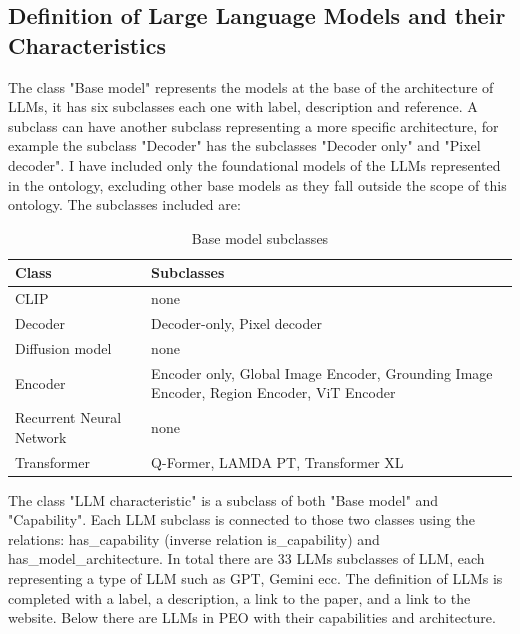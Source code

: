 \subsection{Definition of Large Language Models and their Characteristics}
\label{subsection:4_3_3_llms}
The class "Base model" represents the models at the base of the architecture of LLMs, it has six subclasses each one with label, description and reference.
A subclass can have another subclass representing a more specific architecture, for example the subclass "Decoder" has the subclasses "Decoder only" and "Pixel decoder". 
I have included only the foundational models of the LLMs represented in the ontology, excluding other base models as they fall outside the scope of this ontology.
The subclasses included are: 
\begin{table}[H]
    \footnotesize 
    \centering
    \begin{tabular}{|>{\raggedright\arraybackslash}p{6cm}|>{\raggedright\arraybackslash}p{6cm}|}
        \hline
        Class & Subclasses \\ \hline
         CLIP & none \\ \hline
         
         Decoder & Decoder-only, Pixel decoder \\ \hline
         
         Diffusion model & none \\ \hline
         
         Encoder & Encoder only, Global Image Encoder, Grounding Image Encoder, Region Encoder, ViT Encoder \\ \hline
         
         Recurrent Neural Network & none \\ \hline

        Transformer & Q-Former, LAMDA PT, Transformer XL \\ \hline
    \end{tabular}
    \caption{Base model subclasses}
\end{table}
The class "LLM characteristic" is a subclass of both "Base model" and "Capability".
Each LLM subclass is connected to those two classes using the relations: has\_capability (inverse relation is\_capability) and has\_model\_architecture.
In total there are 33 LLMs subclasses of LLM, each representing a type of LLM such as GPT, Gemini ecc.
The definition of LLMs is completed with a label, a description, a link to the paper, and a link to the website.
Below there are LLMs in PEO with their capabilities and architecture.
